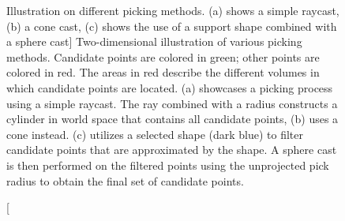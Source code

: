 \begin{figure}[p]
    \centering
    \par\medskip
    \par\medskip        
    \caption
    [Illustration on different picking methods. (a) shows a simple raycast, (b) a cone cast, (c) shows the use of a support shape combined with a sphere cast]
    {Two-dimensional illustration of various picking methods. Candidate points are colored in green; other points are colored in red. The areas in red describe the different volumes in which candidate points are located. (a) showcases a picking process using a simple raycast. The ray combined with a radius constructs a cylinder in world space that contains all candidate points, (b) uses a cone instead. (c) utilizes a selected shape (dark blue) to filter candidate points that are approximated by the shape. A sphere cast is then performed on the filtered points using the unprojected pick radius to obtain the final set of candidate points. }
    \label{fig:picking_overview}
\end{figure}

